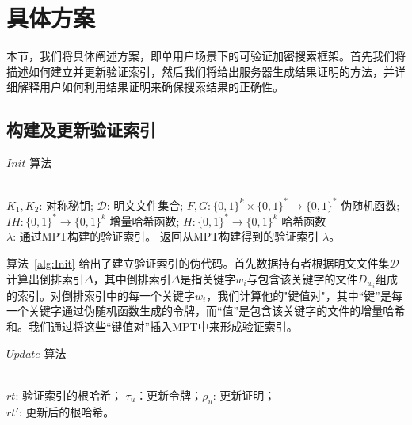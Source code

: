 \section{具体方案}
本节，我们将具体阐述\single 方案，即单用户场景下的可验证加密搜索框架。首先我们将描述如何建立并更新验证索引，然后我们将给出服务器生成结果证明的方法，并详细解释用户如何利用结果证明来确保搜索结果的正确性。

\subsection{构建及更新验证索引}
\begin{algorithm}[ht]
  \caption{$Init$ 算法}
  \label{alg:Init}
  \begin{algorithmic}[1]
    \REQUIRE ~~\\{$K_1,K_2$: 对称秘钥; $\mathcal{D}$: 明文文件集合;  $F, G: \{0, 1\}^k \times \{0, 1\}^* \rightarrow \{0, 1\}^*$ 伪随机函数; $IH: \{0, 1\}^* \rightarrow \{0, 1\}^k$ 增量哈希函数; $H: \{0, 1\}^* \rightarrow \{0, 1\}^k$ 哈希函数}
    \ENSURE ~~\\{$\lambda$: 通过MPT构建的验证索引。}
              \ENDFOR
              \RETURN 返回从MPT构建得到的验证索引 $\lambda$。
  \end{algorithmic}
\end{algorithm}

算法~\ref{alg:Init} 给出了建立验证索引的伪代码。首先数据持有者根据明文文件集$\mathcal{D}$计算出倒排索引$\Delta$，其中倒排索引$\Delta$是指关键字$w_i$与包含该关键字的文件$D_{w_i}$组成的索引。对倒排索引中的每一个关键字$w_i$，我们计算他的"键值对"，其中“键”是每一个关键字通过伪随机函数生成的令牌，而“值”是包含该关键字的文件的增量哈希和。我们通过将这些“键值对”插入MPT中来形成验证索引。

\begin{algorithm}[ht]
  \caption{$Update$ 算法}
  \label{alg:update}
  \begin{algorithmic}[1]
    \REQUIRE ~~\\{$rt$: 验证索引的根哈希； $\tau_u$：更新令牌；$\rho_u$: 更新证明；}
    \ENSURE ~~\\{$rt'$: 更新后的根哈希。}
                \ENDIF
              \ENDFOR
  \end{algorithmic}
\end{algorithm}

